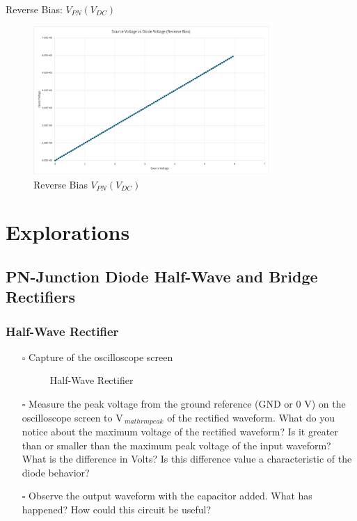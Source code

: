 \documentclass[12pt]{article}
\begin{document}
\begin{itemize}
Reverse Bias: $V_{PN}(V_{DC})$
\begin{figure}[h!tbp]
    \centering
    \includegraphics[width=0.8\textwidth]{V_PN_reverse.png}
    \caption{Reverse Bias $V_{PN}(V_{DC})$}
    \label{fig:reverse-bias_V}
\end{figure}
    

\end{itemize}
\newpage
\newpage
\section{Explorations}
\subsection{PN-Junction Diode Half-Wave and Bridge Rectifiers}
\subsubsection*{Half-Wave Rectifier}
\begin{itemize}
\item[$\square$]{\label{item1}} Capture of the oscilloscope
screen
\begin{figure}[h]
\centering
\caption{Half-Wave Rectifier}
\label{fig:half-wave}
\end{figure}
\item[$\square$]{\label{item2}} Measure the peak voltage from the
ground reference (GND or 0 V) on the oscilloscope screen to V$_{\
mathrm{peak}}$ of the rectified waveform. What do you notice about
the maximum voltage of the rectified waveform? Is it greater than
or smaller than the maximum peak voltage of the input waveform?
What is the difference in Volts? Is this difference value a
characteristic of the diode behavior?
\item[$\square$] Observe the output waveform with the capacitor
added. What has happened? How could this circuit be useful?
\end{itemize}
\end{document}
